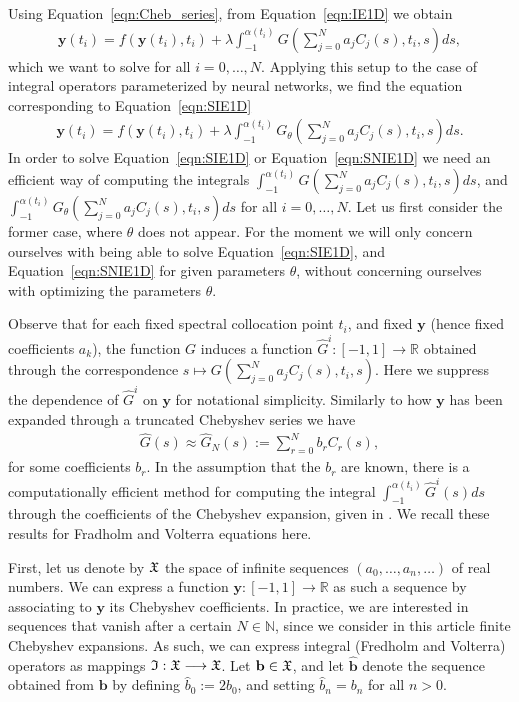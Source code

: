 \documentclass[11pt,fleqn]{amsart} %
\begin{document}
	Using Equation~\eqref{eqn:Cheb_series}, from Equation~\eqref{eqn:IE1D} we obtain
	\begin{eqnarray}\label{eqn:SIE1D}
	\mathbf y(t_i) = f(\mathbf y(t_i),t_i) + \lambda\int_{-1}^{\alpha(t_i)} G(\sum_{j=0}^N a_j C_j(s),t_i,s)ds,
	\end{eqnarray}
	which we want to solve for all $i=0, \ldots, N$. Applying this setup to the case of integral operators parameterized by neural networks, we find the equation corresponding to Equation~\eqref{eqn:SIE1D} 
	\begin{eqnarray}\label{eqn:SNIE1D}
	\mathbf y(t_i) = f(\mathbf y(t_i),t_i) + \lambda\int_{-1}^{\alpha(t_i)} G_\theta(\sum_{j=0}^N a_j C_j(s),t_i,s)ds.
	\end{eqnarray}
	In order to solve Equation~\eqref{eqn:SIE1D} or Equation~\eqref{eqn:SNIE1D}  we need an efficient way of computing the integrals $\int_{-1}^{\alpha(t_i)} G(\sum_{j=0}^N a_j C_j(s),t_i,s)ds$, and $\int_{-1}^{\alpha(t_i)} G_\theta(\sum_{j=0}^N a_j C_j(s),t_i,s)ds$ for all $i = 0, \ldots, N$. Let us first consider the former case, where $\theta$ does not appear. For the moment we will only concern ourselves with being able to solve Equation~\eqref{eqn:SIE1D}, and Equation~\eqref{eqn:SNIE1D} for given parameters $\theta$, without concerning ourselves with optimizing the parameters $\theta$. 
	
	Observe that for each fixed spectral collocation point $t_i$, and fixed $\mathbf y$ (hence fixed coefficients $a_k$), the function $G$ induces a function $\hat G^i : [-1,1] \longrightarrow \mathbb R$ obtained through the correspondence $s\mapsto G(\sum_{j=0}^N a_j C_j(s),t_i,s)$. Here we suppress the dependence of $\hat G^i$ on $\mathbf y$ for notational simplicity. Similarly to how $\mathbf y$ has been expanded through a truncated Chebyshev series we have
	\begin{eqnarray}
	\hat G(s) \approx \hat G_N(s) :=  \sum_{r=0}^N b_r C_r(s),
	\end{eqnarray}
	for some coefficients $b_r$. In the assumption that the $b_r$ are known, there is a computationally efficient method for computing the integral $\int_{-1}^{\alpha(t_i)} \hat G^i(s)ds$ through the coefficients of the Chebyshev expansion, given in \cite{Got-Ors,Greengard}. We recall these results for Fradholm and Volterra equations here. 
	
	First, let us denote by $\frak X$ the space of infinite sequences $(a_0, \ldots , a_n, \ldots)$ of real numbers. We can express a function $\mathbf y : [-1,1] \longrightarrow \mathbb R$ as such a sequence by associating to $\mathbf y$ its Chebyshev coefficients. In practice, we are interested in sequences that vanish after a certain $N\in \mathbb N$, since we consider in this article finite Chebyshev expansions.  As such, we can express integral (Fredholm and Volterra) operators as mappings $\frak I: \frak X \longrightarrow \frak X$. Let $\mathbf b \in \frak X$, and let $\hat{\mathbf b}$ denote the sequence obtained from $\mathbf b$ by defining $\hat b_0 := 2b_0$, and setting $\hat b_n = b_n$ for all $n>0$. 
	
\end{document}
